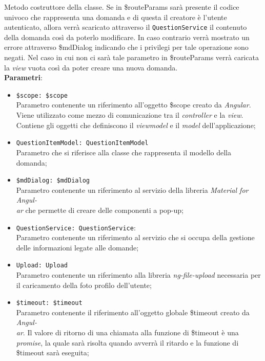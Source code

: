 \begin{itemize}
\begin{itemize}
		Metodo costruttore della classe. Se in \$routeParams sarà presente il codice univoco che rappresenta una domanda e di questa il creatore è l'utente autenticato, allora verrà scaricato attraverso il \texttt{QuestionService} il contenuto della domanda così da poterlo modificare. In caso contrario verrà mostrato un errore attraverso \$mdDialog indicando che i privilegi per tale operazione sono negati. Nel caso in cui non ci sarà tale parametro in \$routeParams verrà caricata la \textit{view} vuota così da poter creare una nuova domanda. \\
		\textbf{Parametri}:
		\begin{itemize}
			\item \texttt{\$scope: \$scope} \\
			Parametro contenente un riferimento all'oggetto \$scope creato da \textit{Angular}. Viene utilizzato come mezzo di comunicazione tra il \textit{controller} e la \textit{view}. Contiene gli oggetti che definiscono il \textit{viewmodel} e il \textit{model} dell'applicazione;
			\item \texttt{QuestionItemModel: QuestionItemModel} \\ 
			Parametro che si riferisce alla classe che rappresenta il modello della domanda;
			\item \texttt{\$mdDialog: \$mdDialog} \\
			Parametro contenente un riferimento al servizio della libreria \textit{Material for Angul-\\ar{}} che permette di creare delle componenti a pop-up;
			\item \texttt{QuestionService: QuestionService}: \\
			Parametro contenente un riferimento al servizio che si occupa della gestione delle informazioni legate alle domande;
			\item \texttt{Upload: Upload} \\
			Parametro contenente un riferimento alla libreria \textit{ng-file-upload} necessaria per il caricamento della foto profilo dell'utente;
			\item \texttt{\$timeout: \$timeout} \\
			Parametro contenente il riferimento all'oggetto globale \$timeout creato da \textit{Angul-\\ar{}}. 
			Il valore di ritorno di una chiamata alla funzione di \$timeout è una \textit{promise}, la quale sarà risolta quando avverrà il ritardo e la funzione di \$timeout sarà eseguita;

\end{itemize}
\end{itemize}
\end{itemize}
